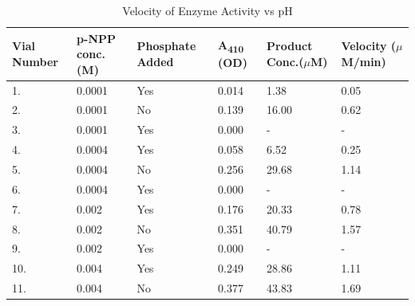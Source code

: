 \documentclass[pdflatex,sn-mathphys]{sn-jnl}%
\theoremstyle{thmstyleone}%
\theoremstyle{thmstyletwo}%
\theoremstyle{thmstylethree}%
\begin{document}
\begin{table}[h]
  \begin{center}
    \begin{minipage}{300pt}
      \caption{Velocity of Enzyme Activity vs pH}\label{tab1}
      \begin{tabular}{  m{4em}  m{4em} m{4.5em}  m{4.5em}  m{4.5em} m{4.5em}}
        \toprule
        Vial Number & p-NPP conc. (M) & Phosphate Added & A\textsubscript{410} (OD) & Product Conc.\footnotemark[1] ($\mu$M) & Velocity ($\mu$M/min) \\
        \midrule
        1.          & 0.0001          & Yes             & 0.014                     & 1.38                                   & 0.05                  \\
        2.          & 0.0001          & No              & 0.139                     & 16.00                                  & 0.62                  \\
        3.          & 0.0001          & Yes             & 0.000                     & -                                      & -                     \\
        4.          & 0.0004          & Yes             & 0.058                     & 6.52                                   & 0.25                  \\
        5.          & 0.0004          & No              & 0.256                     & 29.68                                  & 1.14                  \\
        6.          & 0.0004          & Yes             & 0.000                     & -                                      & -                     \\
        7.          & 0.002           & Yes             & 0.176                     & 20.33                                  & 0.78                  \\
        8.          & 0.002           & No              & 0.351                     & 40.79                                  & 1.57                  \\
        9.          & 0.002           & Yes             & 0.000                     & -                                      & -                     \\
        10.         & 0.004           & Yes             & 0.249                     & 28.86                                  & 1.11                  \\
        11.         & 0.004           & No              & 0.377                     & 43.83                                  & 1.69                  \\

\end{tabular}
\end{minipage}
\end{center}
\end{table}
\end{document}
